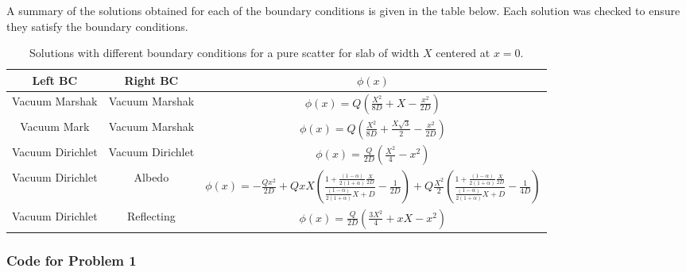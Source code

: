 \documentclass[12pt]{article}
\newcommand{\A}{\frac{(1-\alpha)}{2(1+\alpha)}}
\newenvironment{solnum}[2][Solution]{\begin{trivlist}
\item[\hskip \labelsep {\bfseries #1}\hskip \labelsep {\bfseries #2:}]\hspace{0.3in}\newline\newline}{\end{trivlist}}
\begin{document}
\begin{solnum}{2}
    



\end{solnum}


%
\clearpage
    
    A summary of the solutions obtained for each of the boundary conditions is given
    in the table below.  Each solution was checked to ensure they satisfy the
    boundary conditions.
    \begin{table}[h]
        \centering
        \caption{Solutions with different boundary conditions for  a pure scatter for slab of width $X$ centered at
        $x=0$.}
        \begin{tabular}{|c|c|c|} \hline
            Left BC & Right BC & $\phi(x)$ \\ \hline
            Vacuum Marshak & Vacuum Marshak & $\phi(x) = Q\left(\frac{X^2}{8D} + X-\frac{x^2}{2D} 
            \right)            $ \\ 
            Vacuum Mark & Vacuum Marshak & $\phi(x) = Q\left(
            \frac{X^2}{8D} + \frac{X\sqrt{3}}{2}-\frac{x^2}{2D}\right)$ \\ 
            Vacuum Dirichlet  & Vacuum Dirichlet & $\phi(x) = \frac{Q}{2D}\left( 
            \frac{X^2}{4} - x^2\right)  $ \\ 
            Vacuum Dirichlet    & Albedo  & $\phi(x) = -\frac{Qx^2}{2D} +
            QxX\left(\frac{1+\A\frac{X}{2D}}{\A X + D} - \frac{1}{2D}  \right) +
            Q\frac{X^2}{2} \left(\frac{1+\A\frac{X}{2D}}{\A X +
            D}-\frac{1}{4D}\right) $ \\
            Vacuum Dirichlet    & Reflecting & $\phi(x) =
            \frac{Q}{2D}\left(\frac{3X^2}{4} + xX  - {x^2}\right)$ \\ \hline
        \end{tabular}
    \end{table}
\clearpage
\subsubsection*{Code for Problem 1}

\end{document}
